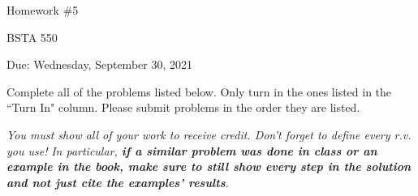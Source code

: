 \documentclass[12pt]{article}
\begin{document}
\begin{center}

Homework \#5

BSTA 550

Due: Wednesday, September 30, 2021

%
\bigskip



\end{center}


\bigskip

Complete all of the problems listed below. \newline 
Only turn in the ones listed in the ``Turn In" column. \newline
Please submit problems in the order they are listed.

\bigskip


\textit{You must show all of your work to receive credit. Don't forget to define every r.v. you use!}  \newline 
\textit{In particular, \textbf{if a similar problem was done in class or an example in the book, make sure to still show every step in the solution and not just cite the examples' results}.}  \newline 



\end{document}
